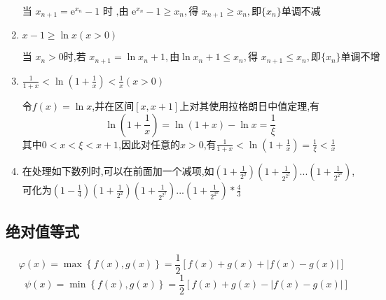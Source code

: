 \documentclass[12pt, a4paper, oneside, UTF8]{ctexbook}  %
\begin{document}
\begin{enumerate}
          \begin{criterion}{}{}
              $\text{当 }x_{n+1}=\mathrm{e}^{x_n}-1\text{ 时 ,由 }\mathrm{e}^{x_n}-1\geqslant x_n,\text{得 }x_{n+1}\geqslant x_n,\text{即} \{x_n\} \text{单调不减}$
          \end{criterion}
    \item $x-1 \geqslant \ln x(x>0)$
          \begin{criterion}{}{}
              $\text{当 }x_{n}>0\text{时,若 }x_{n+1}=\ln x_{n}+1,\text{由}\ln x_{n}+1\leqslant x_{n},\text{得 }x_{n+1}\leqslant x_{n},\text{即}\{ x_{n}\} \text{单调不增}$
          \end{criterion}
    \item $\frac{1}{1+x}<\ln(1+\frac{1}{x})<\frac{1}{x}(x>0)$
          \begin{criterion}{}{}
              令$f(x)=\ln x$,并在区间$[x,x+1]$上对其使用拉格朗日中值定理,有
              $$
                  \ln\left(1+\frac{1}{x}\right)=\ln(1+x)-\ln x=\frac{1}{\xi}
              $$
              其中$0<x<\xi<x+1$,因此对任意的$x>0$,有$\frac{1}{1+x}<\ln\left(1+\frac{1}{x}\right)=\frac{1}{\xi}<\frac{1}{x}$
          \end{criterion}
    \item 在处理如下数列时,可以在前面加一个减项,如$(1+\frac{1}{2^2})(1+\frac{1}{2^{2^2}})...(1+\frac{1}{2^{2^n}})$,可化为$(1-\frac{1}{4})(1+\frac{1}{2^2})(1+\frac{1}{2^{2^2}})...(1+\frac{1}{2^{2^n}})*\frac{4}{3}$
\end{enumerate}
\subsection{绝对值等式}
$$\varphi(x)=\operatorname*{max}\left\{f(x),g(x)\right\}=\frac{1}{2}[f(x)+g(x)+|f(x)-g(x)|]$$
$$\quad\psi(x)=\operatorname*{min}\left\{f(x),g(x) \right\}=\frac{1}{2}[f(x)+g(x)-|f(x)-g(x)|]$$

\ifx\allfiles\undefined
\end{document}
